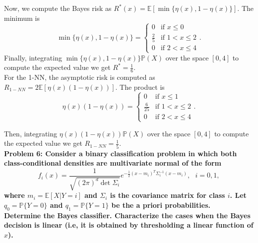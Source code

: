 \documentclass[11pt, english]{article}
\begin{document}
Now, we compute the Bayes risk as $R^*(x)=\mathbb{E}[\min\{\eta(x),1-\eta(x)\}]$. The minimum is
\begin{equation}
	\min\{\eta(x),1-\eta(x)\}=\left\{\begin{array}{ll}
0 & \text{if }x\leq 0\\
\frac{2}{5} & \text{if } 1<x\leq 2\\
0 & \text{if } 2<x\leq 4
\end{array}\right..
\end{equation}
Finally, integrating $\min\{\eta(x),1-\eta(x)\}\mathbb{P}(X)$
 over the space $[0,4]$ to compute the expected value we get $R^*=\frac{1}{6}$.\\
 
 For the 1-NN, the asymptotic risk is computed as $R_{1-NN}=2\mathbb{E}[\eta(x)(1-\eta(x))]$. The product is
 \begin{equation}
 	\eta(x)(1-\eta(x))=\left\{\begin{array}{ll}
 	0 & \text{if }x\leq 1\\
 	\frac{6}{25} & \text{if }1<x\leq 2\\
 	0 & \text{if }2<x\leq 4
 	\end{array}\right..
 \end{equation}
 
 Then, integrating $\eta(x)(1-\eta(x))\mathbb{P}(X)$ over the space $[0,4]$ to compute the expected value we get $R_{1-NN}=\frac{1}{5}$.\\
 
 \textbf{Problem 6: Consider a binary classification problem in which both class-conditional densities are
 	multivariate normal of the form}
 \begin{equation}
 	f_i(x)=\frac{1}{\sqrt{(2\pi)^d\det\Sigma_i}}e^{-\frac{1}{2}(x-m_i)^T\Sigma_i^{-1}(x-m_i)}, \text{ }i=0,1,
 \end{equation}
 \textbf{where $m_i=\mathbb{E}[X|Y=i]$ and $\Sigma_i$ is the covariance matrix for class $i$. Let $q_0=\mathbb{P}\{Y=0\}$ and $q_1=\mathbb{P}\{Y=1\}$ be the a priori probabilities.\\ Determine the Bayes classifier. Characterize the cases when the Bayes decision is linear (i.e, it is obtained by thresholding a linear function of $x$).\\}
 
\end{document}
